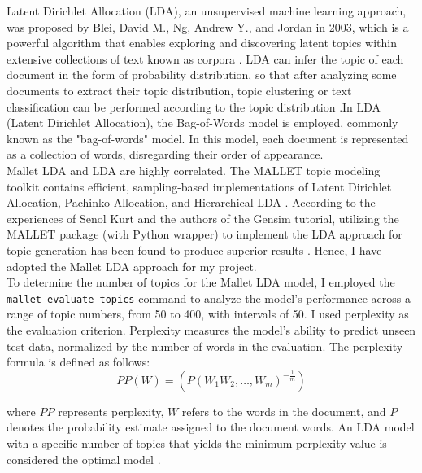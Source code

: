 Latent Dirichlet Allocation (LDA), an unsupervised machine learning approach, was proposed by Blei, David M., Ng, Andrew Y., and Jordan in 2003, which is a powerful algorithm that enables exploring and discovering latent topics within extensive collections of text known as corpora \citep{chipidza2022topic}. LDA can infer the topic of each document in the form of probability distribution, so that after analyzing some documents to extract their topic distribution, topic clustering or text classification can be performed according to the topic distribution \citep{blei2012probabilistic}.In LDA (Latent Dirichlet Allocation), the Bag-of-Words model is employed, commonly known as the "bag-of-words" model. In this model, each document is represented as a collection of words, disregarding their order of appearance. \\

Mallet LDA and LDA are highly correlated. The MALLET topic modeling toolkit contains efficient, sampling-based implementations of Latent Dirichlet Allocation, Pachinko Allocation, and Hierarchical LDA \citep{mallet}. According to the experiences of Senol Kurt and the authors of the Gensim tutorial, utilizing the MALLET package (with Python wrapper) to implement the LDA approach for topic generation has been found to produce superior results \citep{kurt2020topic}. Hence, I have adopted the Mallet LDA approach for my project.\\

To determine the number of topics for the Mallet LDA model, I employed the \texttt{mallet evaluate-topics} command to analyze the model's performance across a range of topic numbers, from 50 to 400, with intervals of 50. I used perplexity as the evaluation criterion. Perplexity measures the model's ability to predict unseen test data, normalized by the number of words in the evaluation. The perplexity formula is defined as follows:
\begin{equation}
PP(W) = \left( P(W_1W_2, \ldots, W_m)^{-\frac{1}{m}} \right)
\end{equation}

where $PP$ represents perplexity, $W$ refers to the words in the document, and $P$ denotes the probability estimate assigned to the document words. An LDA model with a specific number of topics that yields the minimum perplexity value is considered the optimal model \citep{neishabouri2020reliability}. \\

